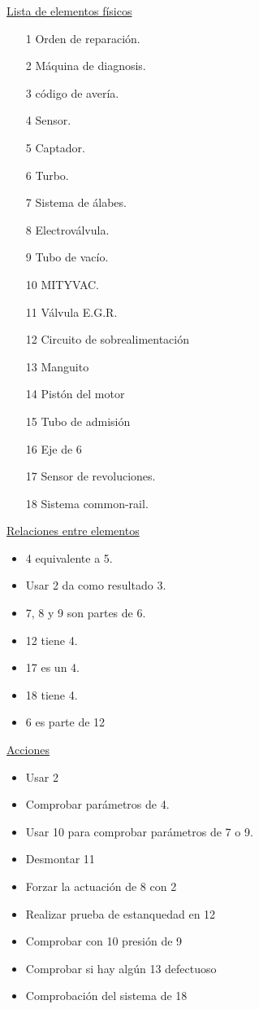 \documentclass[a4paper,12pt]{article}
\begin{document}
\underline{Lista de elementos físicos}
\begin{itemize}
\item[1] Orden de reparación.
\item[2] Máquina de diagnosis.
\item[3] código de avería.
\item[4] Sensor.
\item[5] Captador.
\item[6] Turbo.
\item[7] Sistema de álabes.
\item[8] Electroválvula.
\item[9] Tubo de vacío.
\item[10] MITYVAC.
\item[11] Válvula E.G.R.
\item[12] Circuito de sobrealimentación
\item[13] Manguito
\item[14] Pistón del motor
\item[15] Tubo de admisión
\item[16] Eje de 6
\item[17] Sensor de revoluciones.
\item[18] Sistema common-rail.
\end{itemize}

\underline{Relaciones entre elementos}
\begin{itemize}
\item 4 equivalente a 5.
\item Usar 2 da como resultado 3.
\item 7, 8 y 9 son partes de 6.
\item 12 tiene 4.
\item 17 es un 4.
\item 18 tiene 4.
\item 6 es parte de 12
\end{itemize}

\underline{Acciones}
\begin{itemize}
\item Usar 2
\item Comprobar parámetros de 4.
\item Usar 10 para comprobar parámetros de 7 o 9.
\item Desmontar 11
\item Forzar la actuación de 8 con 2
\item Realizar prueba de estanquedad en 12
\item Comprobar con 10 presión de 9
\item Comprobar si hay algún 13 defectuoso
\item Comprobación del sistema de 18
\end{itemize}
\end{document}
